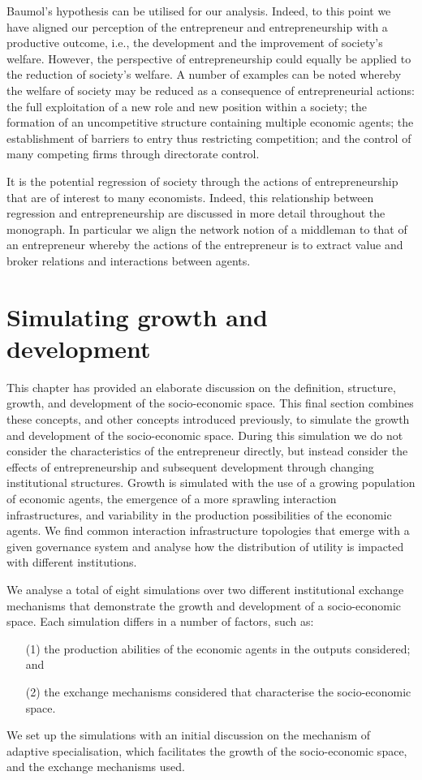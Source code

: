 Baumol's hypothesis can be utilised for our analysis. Indeed, to this point we have aligned our perception of the entrepreneur and entrepreneurship with a productive outcome, i.e., the development and the improvement of society's welfare. However, the perspective of entrepreneurship could equally be applied to the reduction of society's welfare. A number of examples can be noted whereby the welfare of society may be reduced as a consequence of entrepreneurial actions: the full exploitation of a new role and new position within a society; the formation of an uncompetitive structure containing multiple economic agents; the establishment of barriers to entry thus restricting competition; and the control of many competing firms through directorate control.

It is the potential regression of society through the actions of entrepreneurship that are of interest to many economists. Indeed, this relationship between regression and entrepreneurship are discussed in more detail throughout the monograph. In particular we align the network notion of a middleman to that of an entrepreneur whereby the actions of the entrepreneur is to extract value and broker relations and interactions between agents.

\section{Simulating growth and development}

This chapter has provided an elaborate discussion on the definition, structure, growth, and development of the socio-economic space. This final section combines these concepts, and other concepts introduced previously, to simulate the growth and development of the socio-economic space. During this simulation we do not consider the characteristics of the entrepreneur directly, but instead consider the effects of entrepreneurship and subsequent development through changing institutional structures. Growth is simulated with the use of a growing population of economic agents, the emergence of a more sprawling interaction infrastructures, and variability in the production possibilities of the economic agents. We find common interaction infrastructure topologies that emerge with a given governance system and analyse how the distribution of utility is impacted with different institutions.

We analyse a total of eight simulations over two different institutional exchange mechanisms that demonstrate the growth and development of a socio-economic space. Each simulation differs in a number of factors, such as: 
\begin{itemize}
\item[(1)] the production abilities of the economic agents in the outputs considered; and 
\item[(2)] the exchange mechanisms considered that characterise the socio-economic space. 
\end{itemize}
We set up the simulations with an initial discussion on the mechanism of adaptive specialisation, which facilitates the growth of the socio-economic space, and the exchange mechanisms used.

